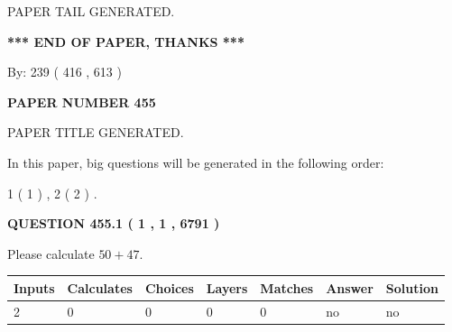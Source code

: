 \documentclass[12pt]{article}
\begin{document}
   
   
   
   
   
 \vspace{0.2in}
 
   
   
\vspace{2.0in} PAPER TAIL GENERATED.
   
   
   
   
\vspace{1.0in} 
{\textbf{\large{ *** END OF PAPER, THANKS *** }}} 
   
   
\hspace{1.0in} By: 
 239 ( 416 ,  613 )
   
   
   
   
\newpage 
\setcounter{page}{ 
   455001 } 
   
   
   
   
 {\textbf{ \Large{ PAPER NUMBER  455  }}}
   
   
\vspace{0.2in}
   
   
   
   
   
   
   
   
 \vspace{0.2in}
 
 
 
 
   
   
 PAPER TITLE GENERATED.
   
   
   
\vspace{0.2in}
   
In this paper, big questions will be generated in the following order: 
   
   
   1 ( 1 )
 ,
   2 ( 2 )
 .
  
\vspace{0.2in}
  
{\textbf{\Large{QUESTION
455.1 
 ( 1 , 1 , 6791 )
}}}
  
  
 
Please calculate $ %
50 +  %
47 $.
 
 
   
   
   
   
\noindent\begin{tabular}{|l|l|l|l|l|l|l|}
 \hline
Inputs & Calculates & Choices & Layers & Matches & Answer & Solution \\ \hline
 2  & 
 0  & 
 0
  & 
 0  & 
 0  & 
  no & 
  no 
  \\ \hline
 \end{tabular}
   
\end{document}
